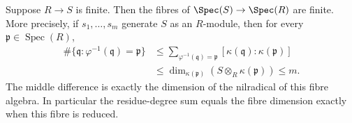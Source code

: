 \begin{lemma}
\label{editorial-source-lemma-finite-finite-fibres}
Suppose $R \to S$ is finite.
Then the fibres of $\Spec(S)\to\Spec(R)$ are finite.
More precisely, if $s_1,\ldots,s_m$ generate $S$ as an $R$-module,
then for every $\mathfrak p\in\operatorname{Spec}(R)$,
$$
\begin{aligned}
\#\{\mathfrak q:\varphi^{-1}(\mathfrak q)=\mathfrak p\}
&\leq\sum_{\varphi^{-1}(\mathfrak q)=\mathfrak p}
[\kappa(\mathfrak q):\kappa(\mathfrak p)]
\\
&\leq\dim_{\kappa(\mathfrak p)}(S\otimes_R\kappa(\mathfrak p))
\leq m.
\end{aligned}
$$
The middle difference is exactly the dimension of the nilradical
of this fibre algebra. In particular the residue-degree sum equals
the fibre dimension exactly when this fibre is reduced.
\end{lemma}

